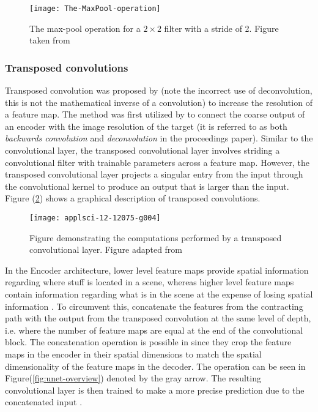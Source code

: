 \documentclass[../main/thesis.tex]{subfiles}
\begin{document}
\begin{figure}
    \centering
    \texttt{[image: The-MaxPool-operation]}
    \caption{\label{fig:maxpool}The max-pool operation for a $2 \times 2$ filter with a stride of 2. Figure taken from \protect\citep{MihaiDaniel2020}}
\end{figure}

\subsubsection{Transposed convolutions}
\label{sec:tconv}
Transposed convolution was proposed by \citet{Zeiler2010} (note the incorrect use of deconvolution, this is not the mathematical inverse of a convolution) to increase the resolution of a feature map. The method was first utilized by \citet{Long2015} to connect the coarse output of an encoder with the image resolution of the target (it is referred to as both \textit{backwards convolution} and \textit{deconvolution} in the proceedings paper). Similar to the convolutional layer, the transposed convolutional layer involves striding a convolutional filter with trainable parameters across a feature map. However, the transposed convolutional layer projects a singular entry from the input through the convolutional kernel to produce an output that is larger than the input. Figure (\ref{fig:tconv}) shows a graphical description of transposed convolutions.

\begin{figure}
    \centering
    \texttt{[image: applsci-12-12075-g004]}
    \caption{\label{fig:tconv}Figure demonstrating the computations performed by a transposed convolutional layer. Figure adapted from \protect\citep{Wu2022}}
\end{figure}

In the Encoder architecture, lower level feature maps provide spatial information regarding where stuff is located in a scene, whereas higher level feature maps contain information regarding what is in the scene at the expense of losing spatial information \citep{Long2015}. To circumvent this, \citet{Ronneberger2015} concatenate the features from the contracting path with the output from the transposed convolution at the same level of depth, i.e. where the number of feature maps are equal at the end of the convolutional block. The concatenation operation is possible in \citet{Ronneberger2015} since they crop the feature maps in the encoder in their spatial dimensions to match the spatial dimensionality of the feature maps in the decoder. The operation can be seen in Figure(\ref{fig:unet-overview}) denoted by the gray arrow. The resulting convolutional layer is then trained to make a more precise prediction due to the concatenated input \citep{Ronneberger2015}.
\end{document}
